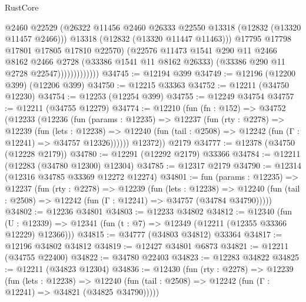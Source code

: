 \begin{lexlean}{RustCore}
\begin{coremodule}
                              @2460
                              @22529
                              (@26322
                                @11456
                                @2460
                                @26333
                                @22550
                                @13318
                                (@12832 (@13320 @11457 @2466)))
                              @13318
                              (@12832 (@13320 @11447 @11463)))
                            @17795
                            @17798
                            @17801
                            @17805
                            @17810
                            @22570)
                          (@22576
                            @11473
                            @1541
                            @290
                            @11
                            @2466
                            @8162
                            @2466
                            @2728
                            (@33386 @1541 @11 @8162 @26333)
                            (@33386 @290 @11 @2728 @22547)))))))))))))
@34745 := @12194 @399
@34749 := @12196 (@12200 @399) (@12206 @399)
@34750 := @12215 @33363
@34752 := @12211 (@34750 @12230)
@34754 := @12253 (@12254 @399)
@34755 := @12249 @34754
@34757 := @12211 (@34755 @12279)
@34774 := @12210
    (fun (fn : @152) =>
    @34752
      (@12233
        (@12236
          (fun (params : @12235) =>
          @12237
            (fun (rty : @2278) =>
            @12239
              (fun (lets : @12238) =>
              @12240 (fun (tail : @2508) => @12242 (fun (Γ : @12241) => @34757 @12326))))))
        @12372))
    @2179
@34777 := @12378 (@34750 (@12228 @2179))
@34780 := @12291 (@12292 @2179) @33366
@34784 := @12211 (@12283 (@34780 @12300) @12304)
@34785 := @12317 @2179
@34790 := @12314 (@12316 @34785 @33369 @12272 @12274)
@34801 := fun (params : @12235) =>
  @12237
    (fun (rty : @2278) =>
    @12239
      (fun (lets : @12238) =>
      @12240 (fun (tail : @2508) => @12242 (fun (Γ : @12241) => @34757 (@34784 @34790)))))
@34802 := @12236 @34801
@34803 := @12233 @34802
@34812 := @12340
    (fun (U : @12339) => @12341 (fun (t : @7) => @12349 (@12211 (@12355 @33366 @12229) @12366)))
@34815 := @34777 (@34803 @34812) @33364
@34817 := @12196 @34802 @34812
@34819 := @12427 @34801 @6873
@34821 := @12211 (@34755 @22400)
@34822 := @34780 @22403
@34823 := @12283 @34822
@34825 := @12211 (@34823 @12304)
@34836 := @12430
    (fun (rty : @2278) =>
    @12239
      (fun (lets : @12238) =>
      @12240 (fun (tail : @2508) => @12242 (fun (Γ : @12241) => @34821 (@34825 @34790)))))

\end{coremodule}
\end{lexlean}
